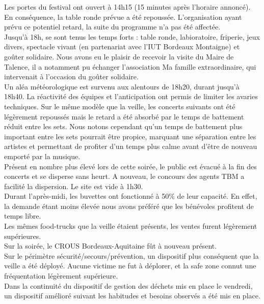 \documentclass[12pt,a4paper]{report}
\begin{document}
Les portes du festival ont ouvert à 14h15 (15 minutes après l'horaire annoncé). En conséquence, la table ronde prévue a été repoussée. L'organisation ayant prévu ce potentiel retard, la suite du programme n'a pas été affectée.\\

Jusqu'à 18h, se sont tenus les temps forts : table ronde, labioratoire, friperie, jeux divers, spectacle vivant (en partenariat avec l'IUT Bordeaux Montaigne) et goûter solidaire. Nous avons eu le plaisir de recevoir la visite du Maire de Talence, il a notamment pu échanger l'association Ma famille extraordinaire, qui intervenait à l'occasion du goûter solidaire.\\

Un aléa météorologique est survenu aux alentours de 18h20, durant jusqu'à 18h40. La réactivité des équipes et l'anticipation ont permis de limiter les avaries techniques. Sur le même modèle que la veille, les concerts suivants ont été légèrement repoussés mais le retard a été absorbé par le temps de battement réduit entre les sets. Nous notons cependant qu'un temps de battement plus important entre les sets pourrait être propice, marquant une séparation entre les artistes et permettant de profiter d'un temps plus calme avant d'être de nouveau emporté par la musique.\\

Présent en nombre plus élevé lors de cette soirée, le public est évacué à la fin des concerts et se disperse sans heurt. A nouveau, le concours des agents TBM a facilité la dispersion. Le site est vide à 1h30.\\

Durant l'après-midi, les buvettes ont fonctionné à 50\% de leur capacité. En effet, la demande étant moins élevée nous avons préféré que les bénévoles profitent de temps libre.\\

Les mêmes food-trucks que la veille étaient présents, les ventes furent légèrement supérieures.\\

Sur la soirée, le CROUS Bordeaux-Aquitaine fût à nouveau présent.\\

Sur le périmètre sécurité/secours/prévention, un dispositif plus conséquent que la veille a été déployé. Aucune victime ne fut à déplorer, et la safe zone connut une fréquentation légèrement supérieure.\\

Dans la continuité du dispositif de gestion des déchets mis en place le vendredi, un dispositif amélioré suivant les habitudes et besoins observés a été mis en place.\\
\end{document}

